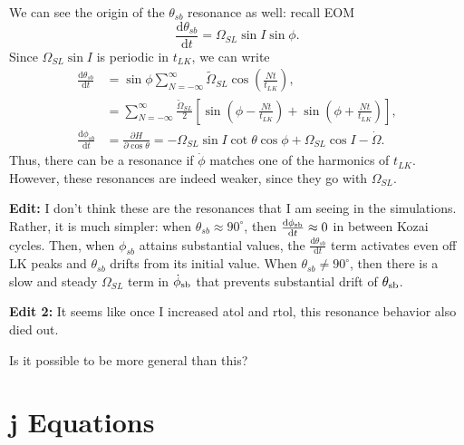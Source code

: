 \documentclass[11pt,
        usenames, %
        dvipsnames %
    ]{article}
\newcommand*{\rd}[2]{\frac{\mathrm{d}#1}{\mathrm{d}#2}}
\newcommand*{\pd}[2]{\frac{\partial#1}{\partial#2}}
\newcommand*{\bm}[1]{\boldsymbol{\mathbf{#1}}}
\newcommand*{\p}[1]{\left(#1\right)}
\newcommand*{\s}[1]{\left[#1\right]}
\begin{document}
We can see the origin of the $\theta_{sb}$ resonance as well: recall EOM
\begin{equation}
    \rd{\theta_{sb}}{t} = \Omega_{SL}\sin I \sin \phi.
\end{equation}
Since $\Omega_{SL}\sin I$ is periodic in $t_{LK}$, we can write
\begin{align}
    \rd{\theta_{sb}}{t} &= \sin \phi \sum\limits_{N = -\infty}^\infty
            \tilde{\Omega}_{SL}\cos\p{\frac{Nt}{t_{LK}}},\\
        &= \sum\limits_{N = -\infty}^\infty
            \frac{\tilde{\Omega}_{SL}}{2}\s{\sin\p{\phi - \frac{Nt}{t_{LK}}}
                + \sin \p{\phi + \frac{Nt}{t_{LK}}}},\\
    \rd{\phi_{sb}}{t} &= \pd{H}{\cos \theta}
        = -\Omega_{SL}\sin I \cot \theta \cos \phi + \Omega_{SL}\cos I
            - \dot{\Omega}.
\end{align}
Thus, there can be a resonance if $\dot{\phi}$ matches one of the harmonics of
$t_{LK}$. However, these resonances are indeed weaker, since they go with
$\Omega_{SL}$.

\textbf{Edit:} I don't think these are the resonances that I am seeing in the
simulations. Rather, it is much simpler: when $\theta_{sb} \approx 90^\circ$,
then $\rd{\phi_{\rm sb}}{t} \approx 0$ in between Kozai cycles. Then, when
$\phi_{sb}$ attains substantial values, the $\rd{\theta_{sb}}{t}$ term
activates even off LK peaks and $\theta_{sb}$ drifts from its initial
value. When $\theta_{sb} \neq 90^\circ$, then there is a slow and steady
$\Omega_{SL}$ term in $\dot{\phi}_{\rm sb}$ that prevents substantial drift of
$\theta_{\rm sb}$.

\textbf{Edit 2:} It seems like once I increased atol and rtol, this resonance
behavior also died out.

Is it possible to be more general than this?

\appendix

\section{$\bm{j}$ Equations}
\end{document}
